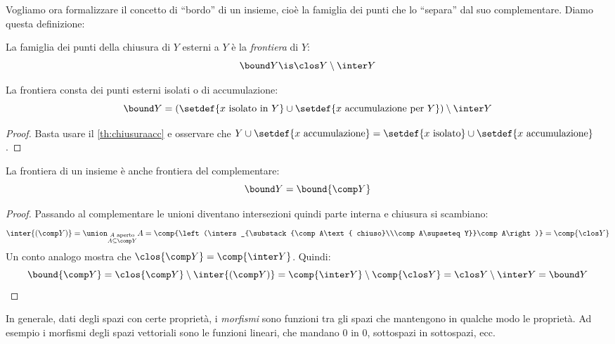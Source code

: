 Vogliamo ora formalizzare il concetto di ``bordo'' di un insieme, cioè la famiglia dei punti che lo ``separa'' dal suo complementare. Diamo questa definizione:

\begin{defn}[Frontiera]
	La famiglia dei punti della chiusura di $Y$ esterni a $Y$ è la \emph{frontiera} di $Y$:
	\[\bound Y\is\clos Y\setminus\inter Y\]
\end{defn}

\begin{prop}
	La frontiera consta dei punti esterni isolati o di accumulazione:
	\[\bound Y=(\setdef{x\text{ isolato in }Y}\cup\setdef{x\text{ accumulazione per }Y})\setminus\inter Y\]
\end{prop}

\begin{proof}
	Basta usare il \autoref{th:chiusuraacc} e osservare che $Y\cup\setdef{x\text{ accumulazione}}=\setdef{x\text{ isolato}}\cup\setdef{x\text{ accumulazione}}$.
\end{proof}


\begin{prop}
	La frontiera di un insieme è anche frontiera del complementare:
	\[\bound Y=\bound{\comp Y}\]
\end{prop}

\begin{proof}
	Passando al complementare le unioni diventano intersezioni quindi parte interna e chiusura si scambiano:
	\[\inter{(\comp Y)}=
	\union_{\substack{A\text{ aperto}\\A\subseteq\comp Y}}A=
	\comp{\left(\inters_{\substack{\comp A\text{ chiuso}\\\comp A\supseteq Y}}\comp A\right)}=
	\comp{\clos Y}\]
	Un conto analogo mostra che $\clos{\comp Y}=\comp{\inter Y}$.
	Quindi:
	\[\bound{\comp Y}=\clos{\comp Y}\setminus\inter{(\comp Y)}=\comp{\inter Y}\setminus\comp{\clos Y}=\clos Y\setminus\inter Y=\bound Y \qedhere\]
\end{proof}


In generale, dati degli spazi con certe proprietà, i \emph{morfismi} sono funzioni tra gli spazi che mantengono in qualche modo le proprietà. Ad esempio i morfismi degli spazi vettoriali sono le funzioni lineari, che mandano 0 in 0, sottospazi in sottospazi, ecc.

